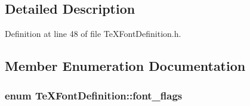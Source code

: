 \subsection{Detailed Description}


Definition at line 48 of file Te\+X\+Font\+Definition.\+h.



\subsection{Member Enumeration Documentation}
\hypertarget{classTeXFontDefinition_a5e758fb1a6ddffb8325b1f893132ce7a}{
\subsubsection[{font\+\_\+flags}]{\setlength{\rightskip}{0pt plus 5cm}enum {\bf Te\+X\+Font\+Definition\+::font\+\_\+flags}}}\label{classTeXFontDefinition_a5e758fb1a6ddffb8325b1f893132ce7a}
